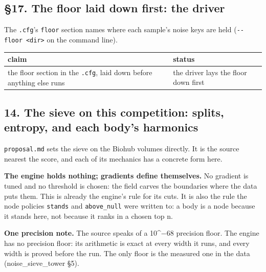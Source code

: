 \subsection{\texorpdfstring{§17. The floor laid down first: the driver}{§17. The floor laid down first: the driver}}

The \texttt{.\allowbreak{}cfg}'s \texttt{floor} section names where each sample's noise keys are held (\texttt{-\allowbreak{}-\allowbreak{}floor <dir>} on the command line).

{\small
\setlength{\tabcolsep}{6pt}
\begin{longtable}{>{\RaggedRight\arraybackslash}p{}>{\RaggedRight\arraybackslash}p{}}
\toprule
claim & status \\
\midrule
\endhead
the floor section in the \texttt{.\allowbreak{}cfg}, laid down before anything else runs & the driver lays the floor down first \\
\bottomrule
\end{longtable}
}

\subsection{\texorpdfstring{14. The sieve on this competition: splits, entropy, and each body's harmonics}{14. The sieve on this competition: splits, entropy, and each body's harmonics}}

\texttt{proposal.\allowbreak{}md} sets the sieve on the Biohub volumes directly. It is the source nearest the score, and each of its mechanics has a concrete form here.

\textbf{The engine holds nothing; gradients define themselves.} No gradient is tuned and no threshold is chosen: the field carves the boundaries where the data puts them. This is already the engine's rule for its cuts. It is also the rule the node policies \texttt{stands} and \texttt{above\_\allowbreak{}null} were written to: a body is a node because it stands here, not because it ranks in a chosen top n.

\textbf{One precision note.} The source speaks of a 10\textasciicircum{}−68 precision floor. The engine has no precision floor: its arithmetic is exact at every width it runs, and every width is proved before the run. The only floor is the measured one in the data (noise\_\allowbreak{}sieve\_\allowbreak{}tower §5).

